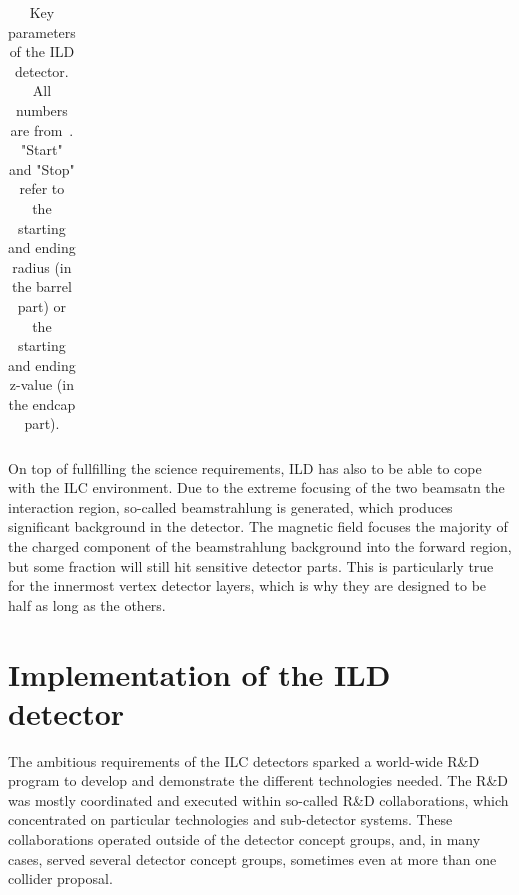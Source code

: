 \documentclass[%
 amsmath,amssymb,
 aps,
]{revtex4-1}
\newcommand{\bottomrule}{\hline}
\begin{document}
\begin{table}[th]
\begin{tabular}{|l|l|c|c|p{4cm}|}
        
\bottomrule
    \end{tabular}
    \caption{Key parameters of the ILD detector. All numbers are from~\cite{Behnke:2013lya}. "Start" and "Stop" refer to the starting and ending radius (in the barrel part) or the starting and ending z-value (in the endcap part).}
    \label{ild:tab:barrelpara}
\end{table}


On top of fullfilling the science requirements, ILD has also to be able to cope with the ILC environment. Due to the extreme focusing of the two beamsatn the interaction region, so-called beamstrahlung is generated, which produces significant background in the detector. The magnetic field focuses the majority of the charged component of the beamstrahlung background into the forward region, but some fraction will still hit sensitive detector parts. This is particularly true for the innermost vertex detector layers, which is why they are designed to be half as long as the others.


\section{Implementation of the ILD detector}
The ambitious requirements of the ILC detectors sparked a world-wide R\&D program to develop and demonstrate the different technologies needed. The R\&D was mostly coordinated and executed within so-called R\&D collaborations, which concentrated on particular technologies and sub-detector systems. These collaborations operated outside of the detector concept groups, and, in many cases, served several detector concept groups, sometimes even at more than one collider proposal. 
\end{document}
